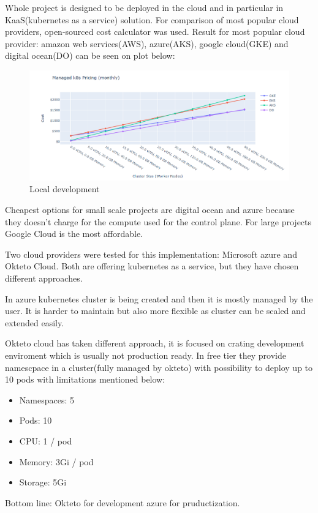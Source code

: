 Whole project is designed to be deployed in the cloud and in particular in KaaS(kubernetes as a service) solution. For comparison of most popular cloud providers, open-sourced cost calculator\cite{managed_kubernetes_pricing} was used. Result for most popular cloud provider: amazon web services(AWS), azure(AKS), google cloud(GKE) and digital ocean(DO) can be seen on plot below:

\begin{figure}[H]
    \centering
    \includegraphics[width=01\textwidth]{pictures/k8s_cost.png}
    \caption{ Local development }
    \label{fig:k8s_cost}
\end{figure}

Cheapest options for small scale projects are digital ocean and azure because they doesn't charge for the compute used for the control plane. For large projects Google Cloud is the most affordable. 

Two cloud  providers were tested for this implementation: Microsoft azure and Okteto Cloud. Both are offering kubernetes as a service, but they have chosen different approaches. 

In azure kubernetes cluster is being created and then it is mostly managed by the user. It is harder to maintain but also more flexible as cluster can be scaled and extended easily.  

Okteto cloud has taken different approach, it is focused on crating development enviroment which is usually not production ready. In free tier they provide namescpace in a cluster(fully managed by okteto) with possibility to deploy up to 10 pods with limitations mentioned below:
\begin{itemize}
    \item Namespaces: 5
    \item Pods: 10
    \item CPU: 1 / pod
    \item Memory: 3Gi / pod
    \item Storage: 5Gi
\end{itemize}

Bottom line: Okteto for development azure for pruductization.